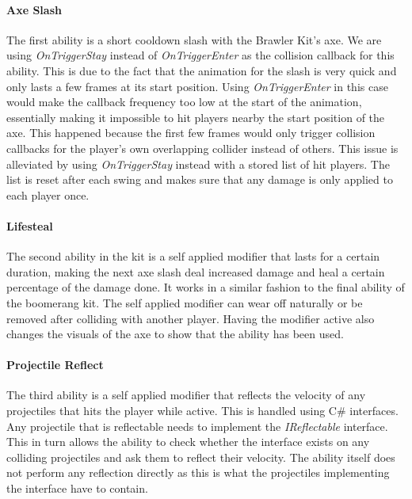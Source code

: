 \paragraph{Axe Slash}
The first ability is a short cooldown slash with the Brawler Kit's axe. We are using \emph{OnTriggerStay} instead of \emph{OnTriggerEnter} as the collision callback for this ability. This is due to the fact that the animation for the slash is very quick and only lasts a few frames at its start position. Using \emph{OnTriggerEnter} in this case would make the callback frequency too low at the start of the animation, essentially making it impossible to hit players nearby the start position of the axe. This happened because the first few frames would only trigger collision callbacks for the player's own overlapping collider instead of others. 
This issue is alleviated by using \emph{OnTriggerStay} instead with a stored list of hit players. The list is reset after each swing and makes sure that any damage is only applied to each player once. 

\paragraph{Lifesteal}
The second ability in the kit is a self applied modifier that lasts for a certain duration, making the next axe slash deal increased damage and heal a certain percentage of the damage done. It works in a similar fashion to the final ability of the boomerang kit. The self applied modifier can wear off naturally or be removed after colliding with another player. Having the modifier active also changes the visuals of the axe to show that the ability has been used. 

\paragraph{Projectile Reflect}
The third ability is a self applied modifier that reflects the velocity of any projectiles that hits the player while active. This is handled using C\# interfaces. Any projectile that is reflectable needs to implement the \emph{IReflectable} interface. This in turn allows the ability to check whether the interface exists on any colliding projectiles and ask them to reflect their velocity. The ability itself does not perform any reflection directly as this is what the projectiles implementing the interface have to contain.


